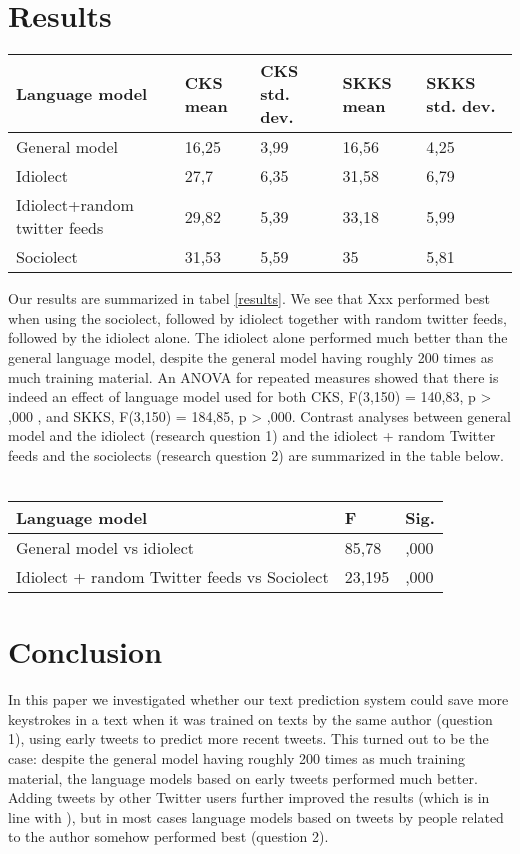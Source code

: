 \documentclass[11pt]{article}
\begin{document}
\section{Results}

\begin{table*}[t]

\begin{tabular}{l|llll}
Language model&CKS mean&CKS std. dev.&SKKS mean&SKKS std. dev.\\
\hline
General model&16,25&3,99&16,56&4,25\\
Idiolect&27,7&6,35&31,58&6,79\\
Idiolect+random twitter feeds&29,82&5,39&33,18&5,99\\
Sociolect&31,53&5,59&35&5,81\\
\end{tabular}
\caption{The percentage of keystrokes saved with four different language models}
\label{results}
\end{table*}

Our results are summarized in tabel \ref{results}. We see that Xxx performed best when using the sociolect, followed by idiolect together with random twitter feeds, followed by the idiolect alone. The idiolect alone performed much better than the general language model, despite the general model having roughly 200 times as much training material. An ANOVA for repeated measures showed that there is indeed an effect of language model used for both CKS, F(3,150) = 140,83, p > ,000 , and SKKS, F(3,150) = 184,85, p > ,000. Contrast analyses between general model and the idiolect (research question 1) and the idiolect + random Twitter feeds and the sociolects (research question 2) are summarized in the table below.\\\\


\begin{tabular}{l|ll}
Language model&F&Sig.\\
\hline
General model vs idiolect&85,78&,000\\
Idiolect + random Twitter feeds vs Sociolect&23,195&,000\\
\end{tabular}

\section{Conclusion}
In this paper we investigated whether our text prediction system could save more keystrokes in a text when it was trained on texts by the same author (question 1), using early tweets to predict more recent tweets. This turned out to be the case: despite the general model having roughly 200 times as much training material, the language models based on early tweets performed much better. Adding tweets by other Twitter users further improved the results (which is in line with \cite{verberne12}), but in most cases language models based on tweets by people related to the author somehow performed best (question 2).



\end{document}
